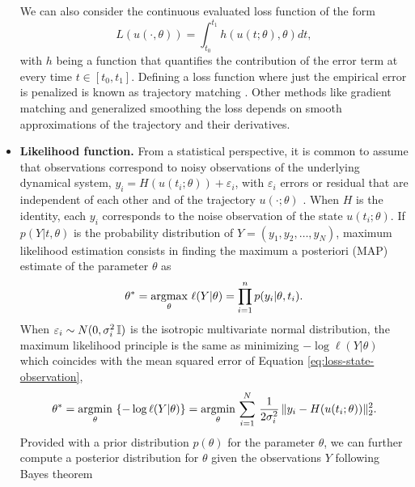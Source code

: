 \begin{itemize}
\begin{equation}
    \end{equation}
    We can also consider the continuous evaluated loss function of the form
    \begin{equation}
         L(u(\cdot, \theta)) = \int_{t_0}^{t_1} h( u(t;\theta), \theta)  dt, 
         \label{eq:integrated-loss-function}
    \end{equation}
    with $h$ being a function that quantifies the contribution of the error term at every time $t \in [t_0, t_1]$. 
    Defining a loss function where just the empirical error is penalized is known as trajectory matching \cite{ramsay2017dynamic}. 
    Other methods like gradient matching and generalized smoothing the loss depends on smooth approximations of the trajectory and their derivatives. 
    \item \textbf{Likelihood function.} From a statistical perspective, it is common to assume that observations correspond to noisy observations of the underlying dynamical system, $y_i = H(u(t_i; \theta)) + \varepsilon_i$, with $\varepsilon_i$ errors or residual that are independent of each other and of the trajectory $u(\cdot ; \theta)$ \cite{ramsay2017dynamic}.
    When $H$ is the identity, each $y_i$ corresponds to the noise observation of the state $u(t_i; \theta)$.
    If $p(Y | t , \theta)$ is the probability distribution of $Y=(y_1, y_2, \ldots, y_N)$, maximum likelihood estimation consists in finding the maximum a posteriori (MAP) estimate of the parameter $\theta$ as
    \begin{equation}
        \theta^* 
        = 
        \underset{\theta}{\text{argmax}} \,\, \ell (Y | \theta) 
        = 
        \prod_{i=1}^n p(y_i | \theta, t_i) .
    \end{equation}
    When $\varepsilon_i \sim N(0, \sigma_i^2 \operatorname{\mathbb{I}})$ is the isotropic multivariate normal distribution, the maximum likelihood principle is the same as minimizing $- \log \ell(Y | \theta)$ which coincides with the mean squared error of Equation \eqref{eq:loss-state-observation}\cite{hastie2009elements},
    \begin{equation}
        \theta^* 
        = 
        \underset{\theta}{\text{argmin}} \, \left \{ - \log \ell (Y | \theta) \right \}
        = 
        \underset{\theta}{\text{argmin}} \, \sum_{i=1}^N 
        \, \frac{1}{2\sigma_i^2} \,
        \| y_i - H(u(t_i; \theta)) \|_2^2 .
    \end{equation}
    Provided with a prior distribution $p(\theta)$ for the parameter $\theta$, we can further compute a posterior distribution for $\theta$ given the observations $Y$ following Bayes theorem 

\end{itemize}
